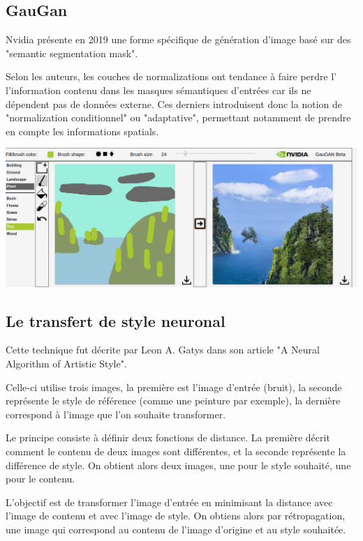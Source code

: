 \documentclass[a4paper, 12pt]{book}
\begin{document}
\subsection{GauGan}
Nvidia \cite{DBLP:journals/corr/abs-1903-07291} présente en 2019 une forme spécifique de génération d'image basé sur des "semantic segmentation mask". 

Selon les auteurs, les couches de normalizations ont tendance à faire perdre l' l'information contenu dans les masques sémantiques d'entrées car ils ne dépendent pas  de données externe. Ces derniers introduisent donc la notion de "normalization conditionnel" ou "adaptative", permettant notamment de prendre en compte les informations spatials.


\includegraphics[width=1\linewidth]{images/test-gaugan.png}


\subsection{Le transfert de style neuronal}

Cette technique fut décrite par Leon A. Gatys dans son article "A Neural Algorithm of Artistic Style".~\cite{DBLP:journals/corr/GatysEB15a}

Celle-ci utilise trois images, la première est l'image d'entrée (bruit), la seconde représente le style de référence (comme une peinture par exemple), la dernière correspond à l'image que l'on souhaite transformer.

Le principe consiste à définir deux fonctions de distance. La première décrit comment le contenu de deux images sont différentes, et la seconde représente la différence de style. On obtient alors deux images, une pour le style souhaité, une pour le contenu.

L'objectif est de transformer l'image d'entrée en minimisant la distance avec l'image de contenu et avec l'image de style. On obtiens alors par rétropagation, une image qui correspond au contenu de l'image d'origine et au style souhaitée.
\end{document}
